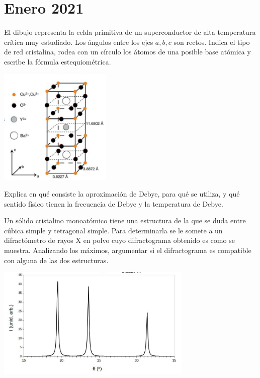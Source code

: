 \section*{Enero 2021}
\setcounter{section}{2} %

\begin{ejercicio}
	El dibujo representa la celda primitiva de un superconductor de alta temperatura crítica muy estudiado. Los ángulos entre los ejes $a,b,c$ son rectos. Indica el tipo de red cristalina, rodea con un círculo los átomos de una posible base atómica y escribe la fórmula estequiométrica. 
	
	\begin{center}
		\includegraphics[width=0.4\textwidth]{Imagenes/Enero_2021_01.png}
	\end{center}
	
	
	
\end{ejercicio}

\begin{ejercicio}
	Explica en qué consiste la aproximación de Debye, para qué se utiliza, y qué sentido físico tienen la frecuencia de Debye y la temperatura de Debye.
\end{ejercicio}

\begin{ejercicio}
	Un sólido cristalino monoatómico tiene una estructura de la que se duda entre cúbica simple y tetragonal simple. Para determinarla se le somete a un difractómetro de rayos X en polvo cuyo difractograma obtenido es como se muestra. Analizando los máximos, argumentar si el difractograma es compatible con alguna de las dos estructuras.
	
	\begin{center}
		\includegraphics[width=0.70\textwidth]{Imagenes/Enero_2021_02.png}
	\end{center}
	
\end{ejercicio}


